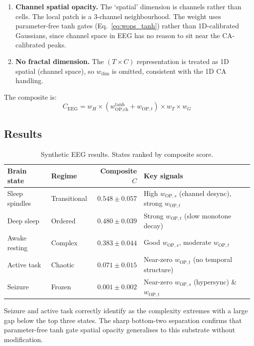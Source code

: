 \documentclass[12pt,a4paper]{article}
\begin{document}
\begin{enumerate}[noitemsep]
  \item \textbf{Channel spatial opacity.}
    The `spatial' dimension is channels rather than cells.
    The local patch is a 3-channel neighbourhood.
    The weight uses parameter-free tanh gates (Eq.~\ref{eq:wops_tanh})
    rather than 1D-calibrated Gaussians, since channel space in EEG
    has no reason to sit near the CA-calibrated peaks.

  \item \textbf{No fractal dimension.}
    The $(T\!\times\!C)$ representation is treated as 1D spatial
    (channel space), so $w_\text{dim}$ is omitted, consistent with
    the 1D CA handling.
\end{enumerate}

The composite is:
\begin{equation}
C_\text{EEG} = w_H \times
               (w_{\text{OP},\text{ch}}^{\text{tanh}} + w_{\text{OP},t})
               \times w_T \times w_G
\end{equation}

\subsection{Results}

\begin{table}[h]
\centering
\caption{Synthetic EEG results. States ranked by composite score.}
\begin{tabular}{llrl}
\toprule
Brain state & Regime & Composite $C$ & Key signals \\
\midrule
Sleep spindles & Transitional
  & $0.548\pm0.057$
  & High $w_{\text{OP},s}$ (channel desync), strong $w_{\text{OP},t}$ \\
Deep sleep & Ordered
  & $0.480\pm0.039$
  & Strong $w_{\text{OP},t}$ (slow monotone decay) \\
Awake resting & Complex
  & $0.383\pm0.044$
  & Good $w_{\text{OP},s}$, moderate $w_{\text{OP},t}$ \\
Active task & Chaotic
  & $0.071\pm0.015$
  & Near-zero $w_{\text{OP},t}$ (no temporal structure) \\
Seizure & Frozen
  & $0.001\pm0.002$
  & Near-zero $w_{\text{OP},s}$ (hypersync) \& $w_{\text{OP},t}$ \\
\bottomrule
\end{tabular}
\end{table}

Seizure and active task correctly identify as the complexity extremes
with a large gap below the top three states.
The sharp bottom-two separation confirms that parameter-free tanh
gate spatial opacity generalises to this substrate without
modification.
\end{document}
